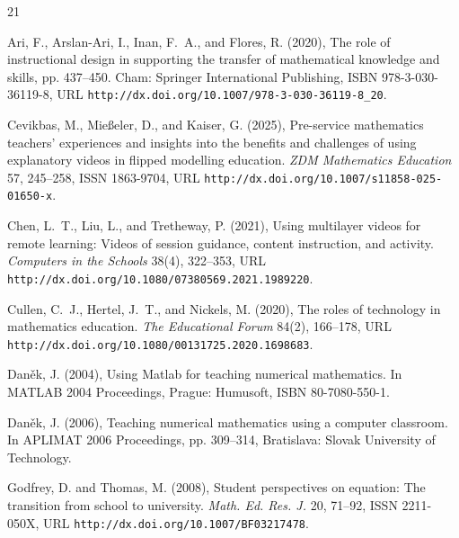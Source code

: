 \documentclass[a4paper,12pt]{article}
\begin{document}
\begin{thebibliography}{21}
\providecommand{\natexlab}[1]{#1}
\providecommand{\url}[1]{\texttt{#1}}
\providecommand{\urlprefix}{URL }
\providecommand{\eprint}[2][]{\url{#2}}

Ari, F., Arslan-Ari, I., Inan, F.~A., and Flores, R. (2020), The role of
  instructional design in supporting the transfer of mathematical knowledge and
  skills, pp. 437--450. Cham: Springer International Publishing, ISBN
  978-3-030-36119-8,
  \urlprefix\url{http://dx.doi.org/10.1007/978-3-030-36119-8_20}.

Cevikbas, M., Mie{\ss}eler, D., and Kaiser, G. (2025), Pre-service mathematics
  teachers' experiences and insights into the benefits and challenges of using
  explanatory videos in flipped modelling education. \emph{ZDM Mathematics
  Education} 57, 245--258, ISSN 1863-9704,
  \urlprefix\url{http://dx.doi.org/10.1007/s11858-025-01650-x}.

Chen, L.~T., Liu, L., and Tretheway, P. (2021), Using multilayer videos for
  remote learning: Videos of session guidance, content instruction, and
  activity. \emph{Computers in the Schools} 38(4), 322--353,
  \urlprefix\url{http://dx.doi.org/10.1080/07380569.2021.1989220}.

Cullen, C.~J., Hertel, J.~T., and Nickels, M. (2020), The roles of technology
  in mathematics education. \emph{The Educational Forum} 84(2), 166--178,
  \urlprefix\url{http://dx.doi.org/10.1080/00131725.2020.1698683}.

Dan\v{e}k, J. (2004), Using {Matlab} for teaching numerical mathematics. In
  MATLAB 2004 Proceedings, Prague: Humusoft, ISBN 80-7080-550-1.

Dan\v{e}k, J. (2006), Teaching numerical mathematics using a computer
  classroom. In APLIMAT 2006 Proceedings, pp. 309--314, Bratislava: Slovak
  University of Technology.

Godfrey, D. and Thomas, M. (2008), Student perspectives on equation: The
  transition from school to university. \emph{Math. Ed. Res. J.} 20, 71--92,
  ISSN 2211-050X, \urlprefix\url{http://dx.doi.org/10.1007/BF03217478}.


\end{thebibliography}
\end{document}
